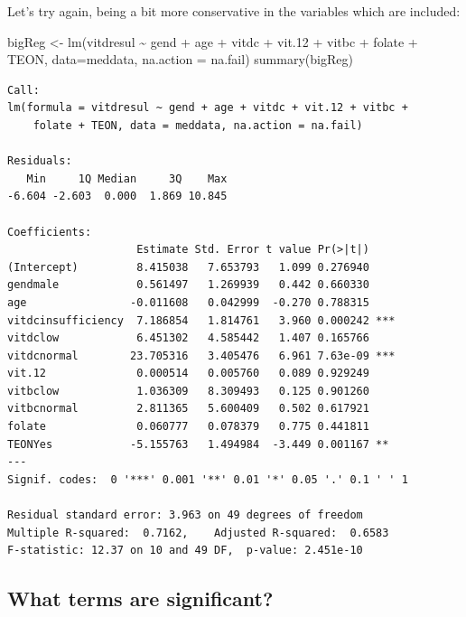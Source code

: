 \documentclass[
  oneside]{krantz}
\newenvironment{Shaded}{\begin{snugshade}}{\end{snugshade}}
\newcommand{\AttributeTok}[1]{\textcolor[rgb]{0.77,0.63,0.00}{#1}}
\newcommand{\FloatTok}[1]{\textcolor[rgb]{0.00,0.00,0.81}{#1}}
\newcommand{\FunctionTok}[1]{\textcolor[rgb]{0.00,0.00,0.00}{#1}}
\newcommand{\NormalTok}[1]{#1}
\newcommand{\OtherTok}[1]{\textcolor[rgb]{0.56,0.35,0.01}{#1}}
\newcommand{\SpecialCharTok}[1]{\textcolor[rgb]{0.00,0.00,0.00}{#1}}
\begin{document}
Let's try again, being a bit more conservative in the variables which are included:

\begin{Shaded}
\begin{Highlighting}[]
\NormalTok{bigReg }\OtherTok{\textless{}{-}} \FunctionTok{lm}\NormalTok{(vitdresul }\SpecialCharTok{\textasciitilde{}}\NormalTok{ gend }\SpecialCharTok{+}\NormalTok{ age }\SpecialCharTok{+}\NormalTok{ vitdc }\SpecialCharTok{+}\NormalTok{ vit}\FloatTok{.12} \SpecialCharTok{+} 
\NormalTok{               vitbc }\SpecialCharTok{+}\NormalTok{ folate }\SpecialCharTok{+}\NormalTok{ TEON, }
             \AttributeTok{data=}\NormalTok{meddata, }\AttributeTok{na.action =}\NormalTok{ na.fail)}
\FunctionTok{summary}\NormalTok{(bigReg)}
\end{Highlighting}
\end{Shaded}

\begin{verbatim}
Call:
lm(formula = vitdresul ~ gend + age + vitdc + vit.12 + vitbc + 
    folate + TEON, data = meddata, na.action = na.fail)

Residuals:
   Min     1Q Median     3Q    Max 
-6.604 -2.603  0.000  1.869 10.845 

Coefficients:
                    Estimate Std. Error t value Pr(>|t|)    
(Intercept)         8.415038   7.653793   1.099 0.276940    
gendmale            0.561497   1.269939   0.442 0.660330    
age                -0.011608   0.042999  -0.270 0.788315    
vitdcinsufficiency  7.186854   1.814761   3.960 0.000242 ***
vitdclow            6.451302   4.585442   1.407 0.165766    
vitdcnormal        23.705316   3.405476   6.961 7.63e-09 ***
vit.12              0.000514   0.005760   0.089 0.929249    
vitbclow            1.036309   8.309493   0.125 0.901260    
vitbcnormal         2.811365   5.600409   0.502 0.617921    
folate              0.060777   0.078379   0.775 0.441811    
TEONYes            -5.155763   1.494984  -3.449 0.001167 ** 
---
Signif. codes:  0 '***' 0.001 '**' 0.01 '*' 0.05 '.' 0.1 ' ' 1

Residual standard error: 3.963 on 49 degrees of freedom
Multiple R-squared:  0.7162,    Adjusted R-squared:  0.6583 
F-statistic: 12.37 on 10 and 49 DF,  p-value: 2.451e-10
\end{verbatim}

\hypertarget{what-terms-are-significant}{%
\subsection{What terms are significant?}\label{what-terms-are-significant}}
\end{document}
